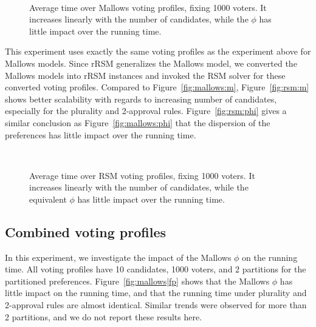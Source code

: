 \begin{figure}[tb!]
	\centering
	\hspace{5em}
	~
	\caption{Average time over Mallows voting profiles, fixing 1000 voters. It increases linearly with the number of candidates, while the $\phi$ has little impact over the running time.}
	\label{fig:mallows}
\end{figure}

 This experiment uses exactly the same voting profiles as the experiment above for Mallows models. Since rRSM generalizes the Mallows model, we converted the Mallows models into rRSM instances and invoked the RSM solver for these converted voting profiles.
Compared to Figure~\ref{fig:mallows:m}, Figure~\ref{fig:rsm:m} shows better scalability with regards to increasing number of candidates, especially for the plurality and 2-approval rules.
Figure~\ref{fig:rsm:phi} gives a similar conclusion as Figure~\ref{fig:mallows:phi} that the dispersion of the preferences has little impact over the running time.

\begin{figure}[tb!]
	\centering
	\hspace{5em}
	~
	\caption{Average time over RSM voting profiles, fixing 1000 voters. It increases linearly with the number of candidates, while the equivalent $\phi$ has little impact over the running time.}
	\label{fig:rsm}
\end{figure}

\subsection{Combined voting profiles}

 In this experiment, we investigate the impact of the Mallows $\phi$ on the running time.
All voting profiles have 10 candidates, 1000 voters, and 2 partitions for the partitioned preferences.
Figure~\ref{fig:mallows|fp} shows that the Mallows $\phi$ has little impact on the running time, and that the running time under plurality and 2-approval rules are almost identical.  Similar trends were observed for more than 2 partitions, and we do not report these results here.


